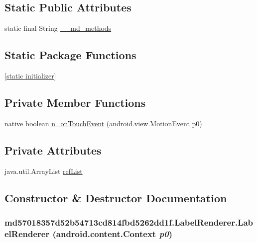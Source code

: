 \subsection*{Static Public Attributes}
\begin{CompactItemize}
\item 
static final String \hyperlink{classmd57018357d52b54713cd814fbd5262dd1f_1_1_label_renderer_cbf8d2cb7c72ee5391f580882a66080f}{\_\-\_\-md\_\-methods}
\end{CompactItemize}
\subsection*{Static Package Functions}
\begin{CompactItemize}
\item 
\hyperlink{classmd57018357d52b54713cd814fbd5262dd1f_1_1_label_renderer_6ab5a62f1e094b7e86c8902176c12c4a}{\mbox{[}static initializer\mbox{]}}
\end{CompactItemize}
\subsection*{Private Member Functions}
\begin{CompactItemize}
\item 
native boolean \hyperlink{classmd57018357d52b54713cd814fbd5262dd1f_1_1_label_renderer_30feb9b98a462c67f2a5295f8ab384cd}{n\_\-onTouchEvent} (android.view.MotionEvent p0)
\end{CompactItemize}
\subsection*{Private Attributes}
\begin{CompactItemize}
\item 
java.util.ArrayList \hyperlink{classmd57018357d52b54713cd814fbd5262dd1f_1_1_label_renderer_95ad3ee6fcc2a2fd40aee083882fac72}{refList}
\end{CompactItemize}


\subsection{Constructor \& Destructor Documentation}
\hypertarget{classmd57018357d52b54713cd814fbd5262dd1f_1_1_label_renderer_aebdd1a385896c15116f4f28a7b14918}{
\subsubsection[{LabelRenderer}]{\setlength{\rightskip}{0pt plus 5cm}md57018357d52b54713cd814fbd5262dd1f.LabelRenderer.LabelRenderer (android.content.Context {\em p0})}}
\label{classmd57018357d52b54713cd814fbd5262dd1f_1_1_label_renderer_aebdd1a385896c15116f4f28a7b14918}


